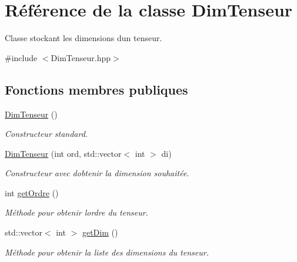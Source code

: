 \hypertarget{class_dim_tenseur}{}\section{Référence de la classe Dim\+Tenseur}
\label{class_dim_tenseur}


Classe stockant les dimensions d\textquotesingle{}un tenseur.  




{\ttfamily \#include $<$Dim\+Tenseur.\+hpp$>$}

\subsection*{Fonctions membres publiques}
\begin{DoxyCompactItemize}
\item 
\mbox{\label{class_dim_tenseur_a599e42c7842cec590b226d3ac676933e}} 
\hyperlink{class_dim_tenseur_a599e42c7842cec590b226d3ac676933e}{Dim\+Tenseur} ()
\begin{DoxyCompactList}\small\item\em Constructeur standard. \end{DoxyCompactList}\item 
\mbox{\label{class_dim_tenseur_aa0faeff63ad7ca344ee327ec974001fe}} 
\hyperlink{class_dim_tenseur_aa0faeff63ad7ca344ee327ec974001fe}{Dim\+Tenseur} (int ord, std\+::vector$<$ int $>$ di)
\begin{DoxyCompactList}\small\item\em Constructeur avec d\textquotesingle{}obtenir la dimension souhaitée. \end{DoxyCompactList}\item 
int \hyperlink{class_dim_tenseur_a0d1e2833c775440baad2ac390cc6e135}{get\+Ordre} ()
\begin{DoxyCompactList}\small\item\em Méthode pour obtenir l\textquotesingle{}ordre du tenseur. \end{DoxyCompactList}\item 
std\+::vector$<$ int $>$ \hyperlink{class_dim_tenseur_a987995f83a0c8debb5f75edb59dad3b0}{get\+Dim} ()
\begin{DoxyCompactList}\small\item\em Méthode pour obtenir la liste des dimensions du tenseur. \end{DoxyCompactList}\end{DoxyCompactItemize}


